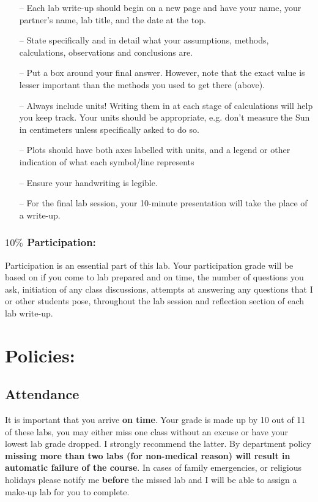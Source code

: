 \documentclass[12pt]{article}
\begin{document}
\begin{itemize}
\item[--] Each lab write-up should begin on a new page and have your name, your partner's name, lab
title, and the date at the top.
\item[--] State specifically and in detail what your assumptions, methods, calculations, observations and
conclusions are.
\item[--] Put a box around your final answer. However, note that the exact value is lesser important than the methods you used to get there (above).
\item[--] Always include units! Writing them in at each stage of calculations will help you keep track. Your
units should be appropriate, e.g. don't measure the Sun in centimeters unless specifically asked
to do so.
\item[--] Plots should have both axes labelled with units, and a legend or other indication of what each
symbol/line represents
\item[--] Ensure your handwriting is legible. 
\item[--] For the final lab session, your 10-minute presentation will take the place of a write-up.
\end{itemize}
 
\subsubsection*{$10\%$ Participation:}
\noindent Participation is an essential part of this lab. Your participation grade will be based on if you come to lab prepared and on time, the number of questions you ask, initiation of any class discussions, attempts at answering any questions that I or other students pose, throughout the lab session and reflection section of each lab write-up. \\
 

\section*{Policies:}
 
\subsection*{Attendance}
 
It is important that you arrive \textbf{on time}. Your grade is made up by 10 out of 11 of these labs, you may either miss one class without an excuse or have your lowest lab grade dropped. I strongly recommend the latter. By department policy \textbf{missing more than two labs (for non-medical reason) will result in automatic failure of the course}. In cases of family emergencies, or religious holidays please notify me \textbf{before} the missed lab and I will be able to assign a make-up lab for you to complete. 
 
\end{document}
